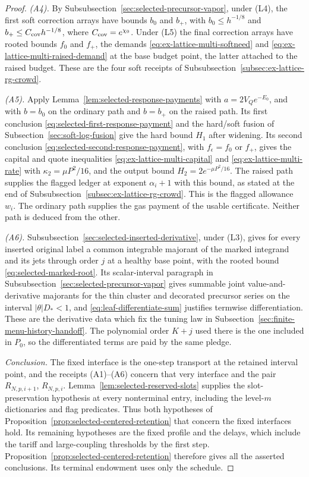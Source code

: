 \begin{proof}
\emph{(A4).} By Subsubsection~\ref{sec:selected-precursor-vapor}, under (L4),
the first soft correction arrays have bounds $b_0$ and $b_+$, with
$b_0\le h^{-1/8}$ and $b_+\le C_{\rm cov}h^{-1/8}$, where
$C_{\rm cov}=e^{\chi_0}$. Under (L5) the final correction arrays have
rooted bounds $f_0$ and $f_+$, the demands
\eqref{eq:ex-lattice-multi-softneed} and
\eqref{eq:ex-lattice-multi-raised-demand} at the base budget point, the
latter attached to the raised budget. These are the four soft receipts
of Subsubsection~\ref{subsec:ex-lattice-rg-crowd}.

\emph{(A5).} Apply Lemma~\ref{lem:selected-response-payments} with
$a=2V_Qe^{-E_0}$, and with $b=b_0$ on the ordinary path and $b=b_+$ on
the raised path. Its first conclusion
\eqref{eq:selected-first-response-payment} and the hard/soft fusion of
Subsection~\ref{sec:soft-log-fusion} give the hard bound $H_1$ after
widening. Its second conclusion
\eqref{eq:selected-second-response-payment}, with $f_\epsilon=f_0$ or
$f_+$, gives the capital and quote inequalities
\eqref{eq:ex-lattice-multi-capital} and \eqref{eq:ex-lattice-multi-rate}
with $\kappa_2=\mu P^2/16$, and the output bound $H_2=2e^{-\mu P^2/16}$.
The raised path supplies the flagged ledger at exponent $\alpha_i+1$
with this bound, as stated at the end of
Subsubsection~\ref{subsec:ex-lattice-rg-crowd}. This is the flagged allowance
$w_i$. The ordinary path supplies the gas payment of the usable
certificate. Neither path is deduced from the other.

\emph{(A6).} Subsubsection~\ref{sec:selected-inserted-derivative}, under (L3),
gives for every inserted original label a common integrable majorant of
the marked integrand and its jets through order $j$ at a healthy base
point, with the rooted bound \eqref{eq:selected-marked-root}. Its
scalar-interval paragraph in Subsubsection~\ref{sec:selected-precursor-vapor}
gives summable joint value-and-derivative majorants for the thin cluster
and decorated precursor series on the interval $|\theta|D_*<1$, and
\eqref{eq:leaf-differentiate-sum} justifies termwise differentiation.
These are the derivative data which fix the tuning law in
Subsection~\ref{sec:finite-menu-history-handoff}. The polynomial order
$K+j$ used there is the one included in $P_0$, so the differentiated
terms are paid by the same pledge.

\emph{Conclusion.} The fixed interface is the one-step transport at the
retained interval point, and the receipts (A1)--(A6) concern that very
interface and the pair $R_{N,p,i+1}$, $R_{N,p,i}$. Lemma~\ref{lem:selected-reserved-slots}
supplies the slot-preservation hypothesis at every nonterminal entry,
including the level-$m$ dictionaries and flag predicates. Thus both
hypotheses of Proposition~\ref{prop:selected-centered-retention} that
concern the fixed interfaces hold. Its remaining hypotheses are the fixed
profile and the delays, which include the tariff and large-coupling thresholds
by the first step. Proposition~\ref{prop:selected-centered-retention}
therefore gives all the asserted conclusions. Its terminal endowment
uses only the schedule.


\end{proof}
